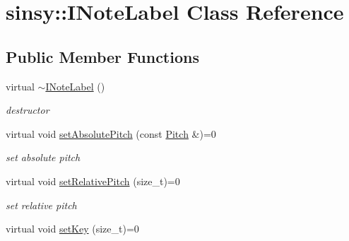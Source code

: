 \hypertarget{classsinsy_1_1INoteLabel}{\section{sinsy\-:\-:\-I\-Note\-Label \-Class \-Reference}
\label{classsinsy_1_1INoteLabel}
}
\subsection*{\-Public \-Member \-Functions}
\begin{DoxyCompactItemize}
\item 
\hypertarget{classsinsy_1_1INoteLabel_a1b0809a1b7961bb200ede93de24c1d4a}{virtual \hyperlink{classsinsy_1_1INoteLabel_a1b0809a1b7961bb200ede93de24c1d4a}{$\sim$\-I\-Note\-Label} ()}\label{classsinsy_1_1INoteLabel_a1b0809a1b7961bb200ede93de24c1d4a}

\begin{DoxyCompactList}\small\item\em destructor \end{DoxyCompactList}\item 
\hypertarget{classsinsy_1_1INoteLabel_a245d872cc6225c8e8176d6f4eb07a32e}{virtual void \hyperlink{classsinsy_1_1INoteLabel_a245d872cc6225c8e8176d6f4eb07a32e}{set\-Absolute\-Pitch} (const \hyperlink{classsinsy_1_1Pitch}{\-Pitch} \&)=0}\label{classsinsy_1_1INoteLabel_a245d872cc6225c8e8176d6f4eb07a32e}

\begin{DoxyCompactList}\small\item\em set absolute pitch \end{DoxyCompactList}\item 
\hypertarget{classsinsy_1_1INoteLabel_a5e12bcb18180fea22c79c7a4ce515e2e}{virtual void \hyperlink{classsinsy_1_1INoteLabel_a5e12bcb18180fea22c79c7a4ce515e2e}{set\-Relative\-Pitch} (size\-\_\-t)=0}\label{classsinsy_1_1INoteLabel_a5e12bcb18180fea22c79c7a4ce515e2e}

\begin{DoxyCompactList}\small\item\em set relative pitch \end{DoxyCompactList}\item 
\hypertarget{classsinsy_1_1INoteLabel_a235457769dacc677f9107a0d0154a100}{virtual void \hyperlink{classsinsy_1_1INoteLabel_a235457769dacc677f9107a0d0154a100}{set\-Key} (size\-\_\-t)=0}\label{classsinsy_1_1INoteLabel_a235457769dacc677f9107a0d0154a100}


\end{DoxyCompactItemize}
